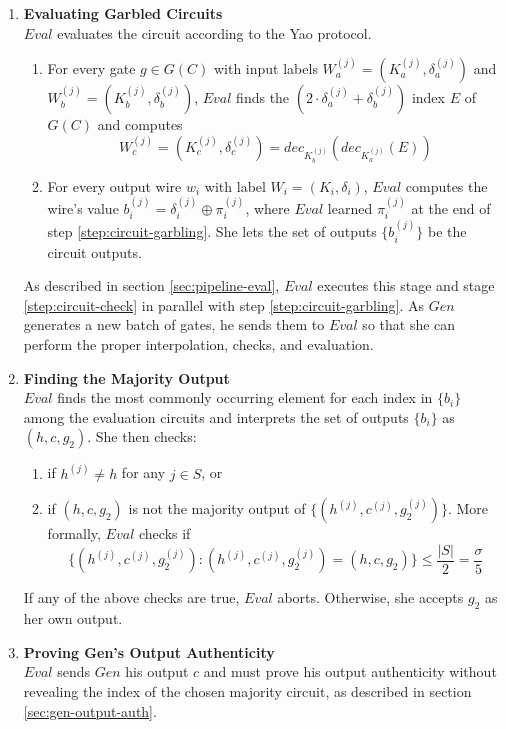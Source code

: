 \documentclass{article}
\begin{document}
\begin{enumerate}
	\item \label{step:circuit-evaluate} \textbf{Evaluating Garbled Circuits}\\
	$Eval$ evaluates the circuit according to the Yao protocol. 
	\begin{enumerate}[label=(\alph*)]
		\item For every gate $g \in G(C)$ with input labels $W_{a}^{(j)} = (K_{a}^{(j)}, \delta_{a}^{(j)})$ and $W_{b}^{(j)} = (K_{b}^{(j)}, \delta_{b}^{(j)})$, $Eval$ finds the $(2 \cdot \delta_{a}^{(j)} + \delta_{b}^{(j)})$ index $E$ of $G(C)$ and computes $$W_{c}^{(j)} = (K_{c}^{(j)}, \delta_{c}^{(j)}) = dec_{K_{b}^{(j)}}(dec_{K_{a}^{(j)}}(E))$$
		\item For every output wire $w_{i}$ with label $W_{i} = (K_{i},\delta_{i})$, $Eval$ computes the wire's value $b_{i}^{(j)} = \delta_{i}^{(j)} \oplus \pi_{i}^{(j)}$, where $Eval$ learned $\pi_{i}^{(j)}$ at the end of step \ref{step:circuit-garbling}. She lets the set of outputs $\{b_{i}^{(j)}\}$ be the circuit outputs.
	\end{enumerate}
	
	As described in section \ref{sec:pipeline-eval}, $Eval$ executes this stage and stage \ref{step:circuit-check} in parallel with step \ref{step:circuit-garbling}. As $Gen$ generates a new batch of gates, he sends them to $Eval$ so that she can perform the proper interpolation, checks, and evaluation.
	
	\item \label{step:majority} \textbf{Finding the Majority Output}\\
	$Eval$ finds the most commonly occurring element for each index in $\{b_{i}\}$ among the evaluation circuits and interprets the set of outputs $\{ b_{i} \}$ as $(h,c,g_{2})$. She then checks:
	\begin{enumerate}[label=(\alph*)]
		\item if $h^{(j)} \neq h$ for any $j \in S$, or
		\item if $(h,c,g_{2})$ is not the majority output of $\{ (h^{(j)},c^{(j)},g_{2}^{(j)}) \}$. More formally, $Eval$ checks if
		$$ \big\{ (h^{(j)},c^{(j)}, g_{2}^{(j)}) : (h^{(j)}, c^{(j)}, g_{2}^{(j)}) =(h,c,g_{2}) \big\} \leq \frac{|S|}{2} = \frac{\sigma}{5}$$
	\end{enumerate}
	If any of the above checks are true, $Eval$ aborts. Otherwise, she accepts $g_{2}$ as her own output.
	
	\item \label{step:gen-out-auth} \textbf{Proving Gen's Output Authenticity}\\
	$Eval$ sends $Gen$ his output $c$ and must prove his output authenticity without revealing the index of the chosen majority circuit, as described in section \ref{sec:gen-output-auth}.
	
\end{enumerate}



\end{document}
